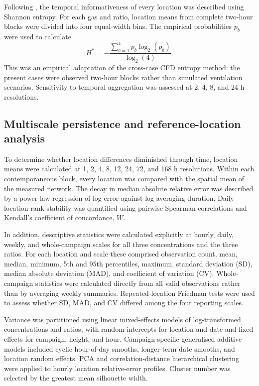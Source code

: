 \documentclass[12pt,a4paper]{article}
\begin{document}
Following \citet{Chen2026}, the temporal informativeness of every location was
described using Shannon entropy. For each gas and ratio, location means from
complete two-hour blocks were divided into four equal-width bins. The
empirical probabilities \(p_b\) were used to calculate
\begin{equation}
H^*=-\frac{\sum_{b=1}^{4}p_b\log_2(p_b)}{\log_2(4)}.
\end{equation}
This was an empirical adaptation of the cross-case CFD entropy method: the
present cases were observed two-hour blocks rather than simulated ventilation
scenarios. Sensitivity to temporal aggregation was assessed at 2, 4, 8, and
24 h resolutions.

\subsection{Multiscale persistence and reference-location analysis}

To determine whether location differences diminished through time, location
means were calculated at 1, 2, 4, 8, 12, 24, 72, and 168 h resolutions. Within
each contemporaneous block, every location was compared with the spatial mean
of the measured network. The decay in median absolute relative error was
described by a power-law regression of log error against log averaging
duration. Daily location-rank stability was quantified using pairwise Spearman
correlations and Kendall's coefficient of concordance, \(W\).

In addition, descriptive statistics were calculated explicitly at hourly,
daily, weekly, and whole-campaign scales for all three concentrations and the
three ratios. For each location and scale these comprised observation count,
mean, median, minimum, 5th and 95th percentiles, maximum, standard deviation
(SD), median absolute deviation (MAD), and coefficient of variation (CV).
Whole-campaign statistics were calculated directly from all valid observations
rather than by averaging weekly summaries. Repeated-location Friedman tests
were used to assess whether SD, MAD, and CV differed among the four reporting
scales.

Variance was partitioned using linear mixed-effects models of log-transformed
concentrations and ratios, with random intercepts for location and date and
fixed effects for campaign, height, and hour. Campaign-specific generalised
additive models included cyclic hour-of-day smooths, longer-term date smooths,
and location random effects. PCA and correlation-distance hierarchical
clustering were applied to hourly location relative-error profiles. Cluster
number was selected by the greatest mean silhouette width.
\end{document}
